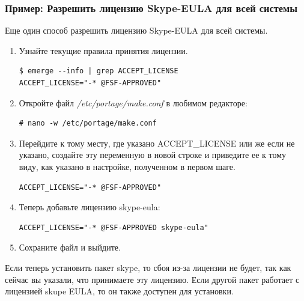 \documentclass[10pt]{book}
\begin{document}
\subsubsection{Пример: Разрешить лицензию Skype-EULA для всей системы}
Еще один способ разрешить лицензию Skype-EULA для всей системы.

\begin{enumerate}
 \item Узнайте текущие правила принятия лицензии.
 \begin{tcolorbox}
\begin{lstlisting}
$ emerge --info | grep ACCEPT_LICENSE
ACCEPT_LICENSE="-* @FSF-APPROVED"
\end{lstlisting}
\end{tcolorbox}
\item Откройте файл \textit{/etc/portage/make.conf} в любимом редакторе:
 \begin{tcolorbox}
\begin{lstlisting}
# nano -w /etc/portage/make.conf
\end{lstlisting}
\end{tcolorbox}
\item Перейдите к тому месту, где указано ACCEPT\_LICENSE или же если не указано, создайте эту переменную в новой строке и приведите ее к тому виду, как указано в настройке, полученном в первом шаге.
 \begin{tcolorbox}
\begin{lstlisting}
ACCEPT_LICENSE="-* @FSF-APPROVED"
\end{lstlisting}
\end{tcolorbox}
\item Теперь добавьте лицензию skype-eula:
 \begin{tcolorbox}
\begin{lstlisting}
ACCEPT_LICENSE="-* @FSF-APPROVED skype-eula"
\end{lstlisting}
\end{tcolorbox}
\item Сохраните файл и выйдите.
\end{enumerate}

Если теперь установить пакет skype, то сбоя из-за лицензии не будет, так как сейчас вы указали, что принимаете эту лицензию. Если другой пакет работает с лицензией skupe EULA, то он также доступен для установки.
\end{document}
